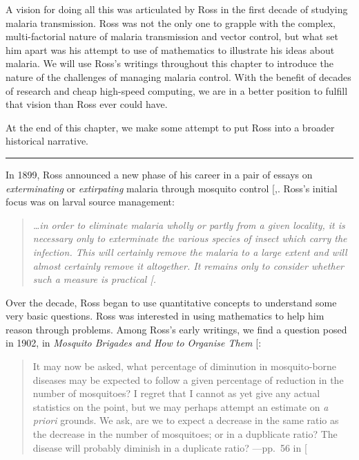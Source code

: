 \documentclass[
]{book}
\begin{document}
A vision for doing all this was articulated by Ross in the first decade of studying malaria transmission.
Ross was not the only one to grapple with the complex, multi-factorial nature of malaria transmission and vector control, but what set him apart was his attempt to use of mathematics to illustrate his ideas about malaria.
We will use Ross's writings throughout this chapter to introduce the nature of the challenges of managing malaria control.
With the benefit of decades of research and cheap high-speed computing, we are in a better position to fulfill that vision than Ross ever could have.

At the end of this chapter, we make some attempt to put Ross into a broader historical narrative.

\begin{center}\rule{0.5\linewidth}{0.5pt}\end{center}

In 1899, Ross announced a new phase of his career in a pair of essays on \emph{exterminating} or \emph{extirpating} malaria through mosquito control {[},\citeproc{ref-RossR1899InauguralLecture}{32}{]}. Ross's initial focus was on larval source management:

\begin{quote}
\emph{\ldots in order to eliminate malaria wholly or partly from a given locality, it is necessary only to exterminate the various species of insect which carry the infection. This will certainly remove the malaria to a large extent and will almost certainly remove it altogether. It remains only to consider whether such a measure is practical {[}\citeproc{ref-RossR1899ExterminationMalaria}{31}{]}.}
\end{quote}

Over the decade, Ross began to use quantitative concepts to understand some very basic questions. Ross was interested in using mathematics to help him reason through problems.
Among Ross's early writings, we find a question posed in 1902, in \emph{Mosquito Brigades and How to Organise Them} {[}\citeproc{ref-RossR1902MosquitoBrigades}{33}{]}:

\begin{quote}
It may now be asked, what percentage of diminution in mosquito-borne diseases may be expected to follow a given percentage of reduction in the number of mosquitoes? I regret that I cannot as yet give any actual statistics on the point, but we may perhaps attempt an estimate on \emph{a priori} grounds. We ask, are we to expect a decrease in the same ratio as the decrease in the number of mosquitoes; or in a dupblicate ratio? The disease will probably diminish in a duplicate ratio? ---pp.~56 in {[}\citeproc{ref-RossR1902MosquitoBrigades}{33}{]}
\end{quote}
\end{document}
